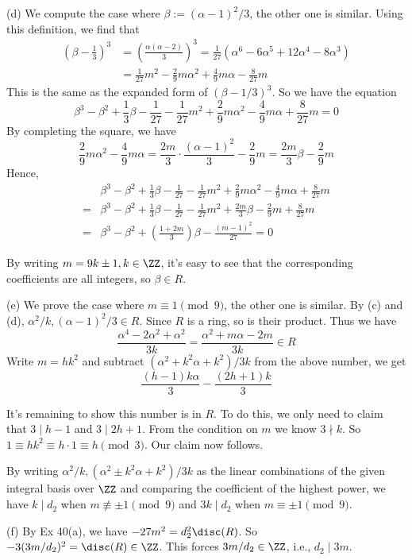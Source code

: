 \documentclass[../Chapter.tex]{subfiles}
\begin{document}
(d) We compute the case where $\beta:=(\alpha-1)^2/3$, the other one is similar. Using this definition, we find that
\begin{align*}
\left(\beta-\frac{1}{3}\right)^3 &= \left(\frac{\alpha(\alpha-2)}{3}\right)^3 = \frac{1}{27}(\alpha^6-6\alpha^5+12\alpha^4-8\alpha^3) \\
&= \frac{1}{27}m^2-\frac{2}{9}m\alpha^2+\frac{4}{9}m\alpha-\frac{8}{27}m
\end{align*}
This is the same as the expanded form of $(\beta-1/3)^3$. So we have the equation $$\beta^3-\beta^2+\frac{1}{3}\beta-\frac{1}{27}-\frac{1}{27}m^2+\frac{2}{9}m\alpha^2-\frac{4}{9}m\alpha+\frac{8}{27}m=0$$
By completing the square, we have $$\frac{2}{9}m\alpha^2-\frac{4}{9}m\alpha = \frac{2m}{3}\cdot\frac{(\alpha-1)^2}{3}-\frac{2}{9}m = \frac{2m}{3}\beta-\frac{2}{9}m$$
Hence,
\begin{align*}
&\beta^3-\beta^2+\frac{1}{3}\beta-\frac{1}{27}-\frac{1}{27}m^2+\frac{2}{9}m\alpha^2-\frac{4}{9}m\alpha+\frac{8}{27}m \\
={} &\beta^3-\beta^2+\frac{1}{3}\beta-\frac{1}{27}-\frac{1}{27}m^2+\frac{2m}{3}\beta-\frac{2}{9}m+\frac{8}{27}m \\
={} &\beta^3-\beta^2+\left(\frac{1+2m}{3}\right)\beta-\frac{(m-1)^2}{27} = 0
\end{align*}

By writing $m=9k\pm1,k\in\ZZ$, it's easy to see that the corresponding coefficients are all integers, so $\beta\in R$.

(e) We prove the case where $m\equiv 1\pmod{9}$, the other one is similar. By (c) and (d), $\alpha^2/k,(\alpha-1)^2/3\in R$. Since $R$ is a ring, so is their product. Thus we have $$\frac{\alpha^4-2\alpha^2+\alpha^2}{3k}=\frac{\alpha^2+m\alpha-2m}{3k}\in R$$
Write $m=hk^2$ and subtract $(\alpha^2+k^2\alpha+k^2)/3k$ from the above number, we get $$\frac{(h-1)k\alpha}{3}-\frac{(2h+1)k}{3}$$

It's remaining to show this number is in $R$. To do this, we only need to claim that $3\mid h-1$ and $3\mid 2h+1$. From the condition on $m$ we know $3\nmid k$. So $1\equiv hk^2\equiv h\cdot 1 \equiv h\pmod{3}$. Our claim now follows.

By writing $\alpha^2/k,(\alpha^2\pm k^2\alpha+k^2)/3k$ as the linear combinations of the given integral basis over $\ZZ$ and comparing the coefficient of the highest power, we have $k\mid d_2$ when $m\not\equiv \pm1 \pmod{9}$ and $3k\mid d_2$ when $m\equiv \pm1 \pmod{9}$.

(f) By Ex 40(a), we have $-27m^2=d_2^2\disc(R)$. So $-3(3m/d_2)^2=\disc(R)\in\ZZ$. This forces $3m/d_2\in\ZZ$, i.e., $d_2\mid 3m$.
\end{document}
